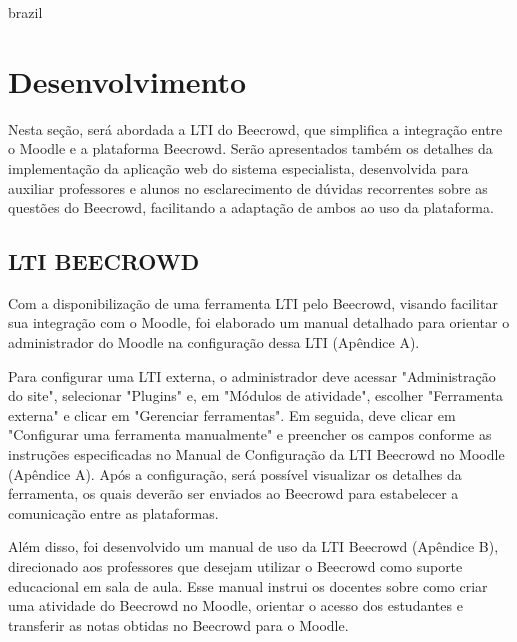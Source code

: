 

\begin{otherlanguage*}{brazil}

\chapter{Desenvolvimento}

Nesta seção, será abordada a LTI do Beecrowd, que simplifica a integração entre o Moodle e a plataforma Beecrowd. Serão apresentados também os detalhes da implementação da aplicação web do sistema especialista, desenvolvida para auxiliar professores e alunos no esclarecimento de dúvidas recorrentes sobre as questões do Beecrowd, facilitando a adaptação de ambos ao uso da plataforma.

\section{LTI BEECROWD}

Com a disponibilização de uma ferramenta LTI pelo Beecrowd, visando facilitar sua integração com o Moodle, foi elaborado um manual detalhado para orientar o administrador do Moodle na configuração dessa LTI (Apêndice A).

Para configurar uma LTI externa, o administrador deve acessar "Administração do site", selecionar "Plugins" e, em "Módulos de atividade", escolher "Ferramenta externa" e clicar em "Gerenciar ferramentas". Em seguida, deve clicar em "Configurar uma ferramenta manualmente" e preencher os campos conforme as instruções especificadas no Manual de Configuração da LTI Beecrowd no Moodle (Apêndice A). Após a configuração, será possível visualizar os detalhes da ferramenta, os quais deverão ser enviados ao Beecrowd para estabelecer a comunicação entre as plataformas.

Além disso, foi desenvolvido um manual de uso da LTI Beecrowd (Apêndice B), direcionado aos professores que desejam utilizar o Beecrowd como suporte educacional em sala de aula. Esse manual instrui os docentes sobre como criar uma atividade do Beecrowd no Moodle, orientar o acesso dos estudantes e transferir as notas obtidas no Beecrowd para o Moodle.


\end{otherlanguage*}
